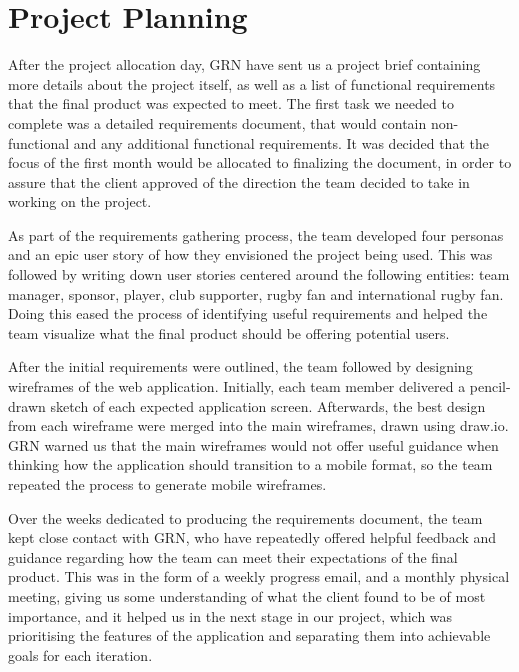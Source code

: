 \documentclass{l3proj}
\begin{document}
\section{Project Planning} %
\label{sec:planning}

After the project allocation day, GRN have sent us a project brief containing
 more details about the project itself, as well as a list of functional
 requirements that the final product was expected to meet. The first
 task we needed to complete was a detailed requirements document, that would
 contain non-functional and any additional functional requirements. It was
 decided that the focus of the first month would be allocated to finalizing
 the document, in order to assure that the client approved of the direction
 the team decided to take in working on the project.

As part of the requirements gathering process, the team developed four personas
 and an epic user story of how they envisioned the project being used. This was followed by
 writing down user stories centered around the following entities: team manager,
 sponsor, player, club supporter, rugby fan and international rugby fan. Doing
 this eased the process of identifying useful requirements and helped the team
 visualize what the final product should be offering potential users.

After the initial requirements were outlined, the team followed by designing
 wireframes of the web application. Initially, each team member delivered a
 pencil-drawn sketch of each expected application screen. Afterwards, the
 best design from each wireframe were merged into the main wireframes, drawn
 using draw.io. GRN warned us that the main wireframes would not offer useful
 guidance when thinking how the application should transition to a mobile format,
 so the team repeated the process to generate mobile wireframes.

Over the weeks dedicated to producing the requirements document, the team
 kept close contact with GRN, who have repeatedly offered helpful feedback
 and guidance regarding how the team can meet their expectations of the
 final product. This was in the form of a weekly progress email, and a monthly
 physical meeting, giving us some understanding of what the client found
 to be of most importance, and it helped us in the next stage in our
 project, which was prioritising the features of the application and separating
 them into achievable goals for each iteration.
\end{document}
